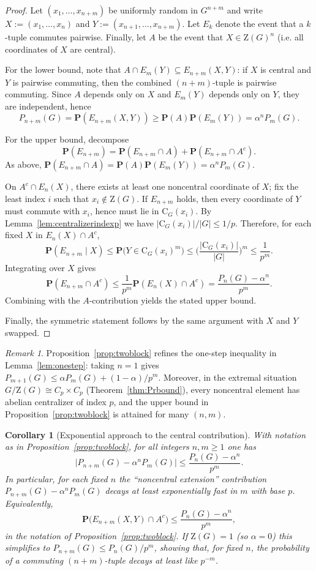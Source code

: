 \documentclass[11pt]{article}
\newtheorem{corollary}[theorem]{Corollary}
\theoremstyle{definition}
\theoremstyle{remark}
\newtheorem{remark}[theorem]{Remark}
\theoremstyle{definition}
\theoremstyle{plain}
\newcommand{\Z}{\mathrm{Z}}
\newcommand{\C}{\mathrm{C}}
\newcommand{\Prob}{\mathbf{P}}
\begin{document}
\begin{proof}
Let $(x_1,\dots,x_{n+m})$ be uniformly random in $G^{n+m}$ and write
$X:=(x_1,\dots,x_n)$ and $Y:=(x_{n+1},\dots,x_{n+m})$.
Let $E_k$ denote the event that a $k$-tuple commutes pairwise.
Finally, let $A$ be the event that $X\in \Z(G)^n$ (i.e. all coordinates of $X$ are central).

For the lower bound, note that $A\cap E_m(Y)\subseteq E_{n+m}(X,Y)$: if $X$ is central and $Y$ is
pairwise commuting, then the combined $(n{+}m)$-tuple is pairwise commuting.
Since $A$ depends only on $X$ and $E_m(Y)$ depends only on $Y$, they are independent, hence
\[
P_{n+m}(G)=\Prob(E_{n+m}(X,Y))\ge \Prob(A)\Prob(E_m(Y))=\alpha^{n}P_m(G).
\]

For the upper bound, decompose
\[
\Prob(E_{n+m})=\Prob(E_{n+m}\cap A)+\Prob(E_{n+m}\cap A^c).
\]
As above, $\Prob(E_{n+m}\cap A)=\Prob(A)\Prob(E_m(Y))=\alpha^{n}P_m(G)$.

On $A^c\cap E_n(X)$, there exists at least one noncentral coordinate of $X$; fix the least index $i$
such that $x_i\notin \Z(G)$.
If $E_{n+m}$ holds, then every coordinate of $Y$ must commute with $x_i$, hence must lie in $\C_G(x_i)$.
By Lemma~\ref{lem:centralizerindexp} we have $|\C_G(x_i)|/|G|\le 1/p$.
Therefore, for each fixed $X$ in $E_n(X)\cap A^c$,
\[
\Prob(E_{n+m}\mid X)\le \Prob\big(Y\in \C_G(x_i)^m\big)\le \Big(\frac{|\C_G(x_i)|}{|G|}\Big)^m\le \frac{1}{p^{m}}.
\]
Integrating over $X$ gives
\[
\Prob(E_{n+m}\cap A^c)\le \frac{1}{p^{m}}\Prob(E_n(X)\cap A^c)=\frac{P_n(G)-\alpha^{n}}{p^{m}}.
\]
Combining with the $A$-contribution yields the stated upper bound.

Finally, the symmetric statement follows by the same argument with $X$ and $Y$ swapped.
\end{proof}

\begin{remark}
Proposition~\ref{prop:twoblock} refines the one-step inequality in Lemma~\ref{lem:onestep}:
taking $n=1$ gives
$P_{m+1}(G)\le \alpha P_m(G)+(1-\alpha)/p^{m}$.
Moreover, in the extremal situation $G/\Z(G)\cong C_p\times C_p$ (Theorem~\ref{thm:Prbound}), every
noncentral element has abelian centralizer of index $p$, and the upper bound in
Proposition~\ref{prop:twoblock} is attained for many $(n,m)$.
\end{remark}

\begin{corollary}[Exponential approach to the central contribution]\label{cor:expcentral}
With notation as in Proposition~\ref{prop:twoblock}, for all integers $n,m\ge 1$ one has
\[
\bigl|P_{n+m}(G)-\alpha^{n}P_m(G)\bigr|\le \frac{P_n(G)-\alpha^{n}}{p^{m}}.
\]
In particular, for each fixed $n$ the ``noncentral extension'' contribution
\(P_{n+m}(G)-\alpha^{n}P_m(G)\) decays at least exponentially fast in $m$ with base $p$.
Equivalently,
\[
\Prob\bigl(E_{n+m}(X,Y)\cap A^c\bigr)\le \frac{P_n(G)-\alpha^{n}}{p^{m}},
\]
in the notation of Proposition~\ref{prop:twoblock}.
If $\Z(G)=1$ (so $\alpha=0$) this simplifies to
\(
P_{n+m}(G)\le P_n(G)/p^{m}
\),
showing that, for fixed $n$, the probability of a commuting $(n{+}m)$-tuple decays at least like $p^{-m}$.
\end{corollary}
\end{document}
